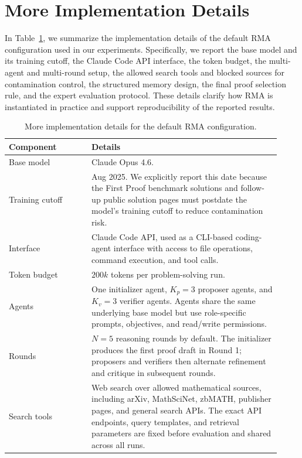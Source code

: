\documentclass{article}
\begin{document}
\section{More Implementation Details}
\label{app-implementation}
In Table~\ref{tab-implementation_details}, we summarize the implementation details of the default RMA configuration used in our experiments. Specifically, we report the base model and its training cutoff, the Claude Code API interface, the token budget, the multi-agent and multi-round setup, the allowed search tools and blocked sources for contamination control, the structured memory design, the final proof selection rule, and the expert evaluation protocol. These details clarify how RMA is instantiated in practice and support reproducibility of the reported results.

\begin{table}[t]
\centering
\caption{More implementation details for the default RMA configuration.}
\label{tab-implementation_details}
\small
\begin{tabular}{p{0.28\linewidth} p{0.64\linewidth}}
\toprule
\textbf{Component} & \textbf{Details} \\
\midrule
Base model 
& Claude Opus 4.6. \\

Training cutoff
& Aug 2025. 
We explicitly report this date because the First Proof benchmark solutions and follow-up public solution pages must postdate the model's training cutoff to reduce contamination risk. \\

Interface 
& Claude Code API, used as a CLI-based coding-agent interface with access to file operations, command execution, and tool calls. \\

Token budget 
& $200k$ tokens per problem-solving run. \\

Agents 
& One initializer agent, $K_p=3$ proposer agents, and $K_v=3$ verifier agents. Agents share the same underlying base model but use role-specific prompts, objectives, and read/write permissions. \\

Rounds 
& $N=5$ reasoning rounds by default. The initializer produces the first proof draft in Round 1; proposers and verifiers then alternate refinement and critique in subsequent rounds. \\

Search tools 
& Web search over allowed mathematical sources, including arXiv, MathSciNet, zbMATH, publisher pages, and general search APIs. The exact API endpoints, query templates, and retrieval parameters are fixed before evaluation and shared across all runs. \\


\end{tabular}
\end{table}
\end{document}
